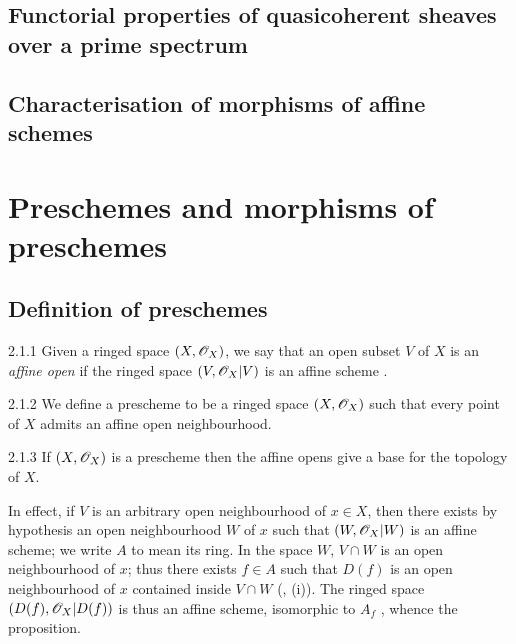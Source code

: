 \documentclass[10pt,oneside]{book}
\begin{document}
\subsection{Functorial properties of quasicoherent sheaves over a prime spectrum}
\label{1-schemes-1.6}

\subsection{Characterisation of morphisms of affine schemes}
\label{1-schemes-1.7}

\section{Preschemes and morphisms of preschemes}
\label{1-schemes-2}

\subsection{Definition of preschemes}
\label{1-schemes-2.1}

\begin{env}{2.1.1}
\label{env-1.2.1.1}
Given a ringed space $(X,\mathscr{O}_X)$, we say that an open subset
$V$ of $X$ is an \emph{affine open} if the ringed space $(V,\mathscr{O}_X|V)$ is an
affine scheme .
\end{env}

\begin{envs}[Definition]{2.1.2}
\label{defn-1.2.1.2}
We define a prescheme to be a ringed space
$(X,\mathscr{O}_X)$ such that every point of $X$ admits an affine open neighbourhood.
\end{envs}

\begin{envs}[Proposition]{2.1.3}
\label{prop-1.2.1.3}
If $(X,\mathscr{O}_X)$ is a prescheme then the affine opens give a base for the topology of $X$.
\end{envs}

In effect, if $V$ is an arbitrary open neighbourhood of $x\in X$, then there
exists by hypothesis an open neighbourhood $W$ of $x$ such that $(W,\mathscr{O}_X|W)$ is
an affine scheme; we write $A$ to mean its ring.  In the space $W$, $V\cap W$ is
an open neighbourhood of $x$; thus there exists $f\in A$ such that $D(f)$ is an
open neighbourhood of $x$ contained inside $V\cap W$ (, (i)).  The ringed
space $(D(f),\mathscr{O}_X|D(f))$ is thus an affine scheme, isomorphic to $A_f$
, whence the proposition.
\end{document}
